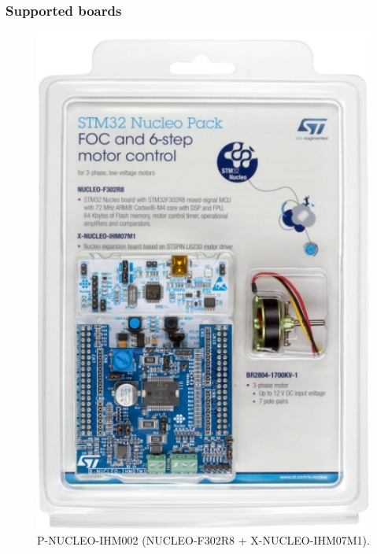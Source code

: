 \documentclass[handout]{beamer}
\begin{document}
\begin{frame}
  \frametitle{Supported boards}

  \begin{figure}
    \centering
    \includegraphics[scale=1]{p-nucleo-ihm002.jpg}
    \caption{P-NUCLEO-IHM002 (NUCLEO-F302R8 + X-NUCLEO-IHM07M1).}
  \end{figure}
\end{frame}
\end{document}
